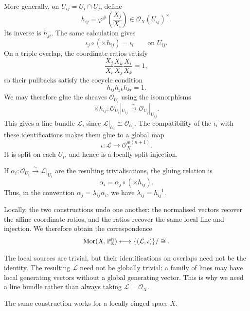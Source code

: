 More generally, on \(U_{ij}=U_i\cap U_j\), define
\[
    h_{ij}
    =
    \varphi^\#\left(\frac{X_j}{X_i}\right)
    \in\mathcal O_X(U_{ij})^\times.
\]
Its inverse is \(h_{ji}\). The same calculation gives
\[
    \iota_j\circ(\times h_{ij})=\iota_i
    \qquad\text{on }U_{ij}.
\]
On a triple overlap, the coordinate ratios satisfy
\[
    \frac{X_j}{X_i}
    \frac{X_k}{X_j}
    \frac{X_i}{X_k}=1,
\]
so their pullbacks satisfy the cocycle condition
\[
    h_{ij}h_{jk}h_{ki}=1.
\]
We may therefore glue the sheaves \(\mathcal O_{U_i}\)
using the isomorphisms
\[
    \times h_{ij}:
    \mathcal O_{U_i}|_{U_{ij}}
    \xrightarrow{\sim}
    \mathcal O_{U_j}|_{U_{ij}}.
\]
This gives a line bundle \(\mathcal L\), since
\(\mathcal L|_{U_i}\cong\mathcal O_{U_i}\).
The compatibility of the \(\iota_i\) with these
identifications makes them glue to a global map
\[
    \iota:\mathcal L\longrightarrow
    \mathcal O_X^{\oplus(n+1)}.
\]
It is split on each \(U_i\), and hence is a locally split
injection.

If
\(\alpha_i:\mathcal O_{U_i}\xrightarrow{\sim}\mathcal L|_{U_i}\)
are the resulting trivialisations, the gluing relation is
\[
    \alpha_i=\alpha_j\circ(\times h_{ij}).
\]
Thus, in the convention \(\alpha_j=\lambda_{ij}\alpha_i\),
we have \(\lambda_{ij}=h_{ij}^{-1}\).

Locally, the two constructions undo one another: the
normalised vectors recover the affine coordinate ratios,
and the ratios recover the same local line and injection.
We therefore obtain the correspondence
\[
    \operatorname{Mor}(X,\mathbb{P}^n_{\mathbb{Z}})
    \longleftrightarrow
    \{(\mathcal L,\iota)\}/\cong.
\]

\begin{remark}
    The local sources are trivial, but their identifications
    on overlaps need not be the identity. The resulting
    \(\mathcal L\) need not be globally trivial: a family of
    lines may have local generating vectors without a global
    generating vector. This is why we need a line bundle
    rather than always taking \(\mathcal L=\mathcal O_X\).

    The same construction works for a locally ringed space
    \(X\).
\end{remark}

